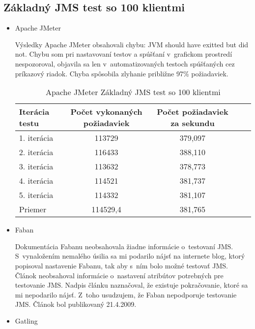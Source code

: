\documentclass[12pt,oneside,final]{fithesis-utf8}
\begin{document}
\subsection{Základný JMS test so 100 klientmi}

\begin{itemize}

\item Apache JMeter

Výsledky Apache JMeter obsahovali chybu: JVM should have exitted but did not. Chybu som pri nastavovaní testov a spúšťaní v~grafickom prostredí nespozoroval, objavila sa len v~automatizovaných testoch spúšťaných cez príkazový riadok. Chyba spôsobila zlyhanie približne 97\% požiadaviek.

\begin{table}[H]
\begin{center}
\begin{tabular}{ | l | c | c | c | c |}
		\hline
		 \textbf{Iterácia testu} & \textbf{Počet vykonaných požiadaviek} & \textbf{Počet požiadaviek za sekundu} \\ \hline
		 1. iterácia & 113729 & 379,097 \\ \hline
		 2. iterácia & 116433 & 388,110 \\ \hline
		 3. iterácia & 113632 & 378,773 \\ \hline
		 4. iterácia & 114521 & 381,737 \\ \hline
		 5. iterácia & 114332 & 381,107 \\ \hline
		 Priemer & 114529,4 & 381,765 \\ \hline
		 
\end{tabular}
\end{center}
\caption{Apache JMeter Základný JMS test so 100 klientmi}
\end{table}

\item Faban

Dokumentácia Fabanu neobsahovala žiadne informácie o~testovaní JMS. S~vynaložením nemalého úsilia sa mi podarilo nájsť na internete blog, ktorý popisoval nastavenie Fabanu, tak aby s~ním bolo možné testovať JMS. Článok neobsahoval informácie o~nastavení atribútov potrebných pre testovanie JMS. Nadpis článku naznačoval, že existuje pokračovanie, ktoré sa mi nepodarilo nájsť. Z~toho usudzujem, že Faban nepodporuje testovanie JMS. Článok bol publikovaný 21.4.2009\cite{FabanBlog}.

\item Gatling


\end{itemize}
\end{document}
